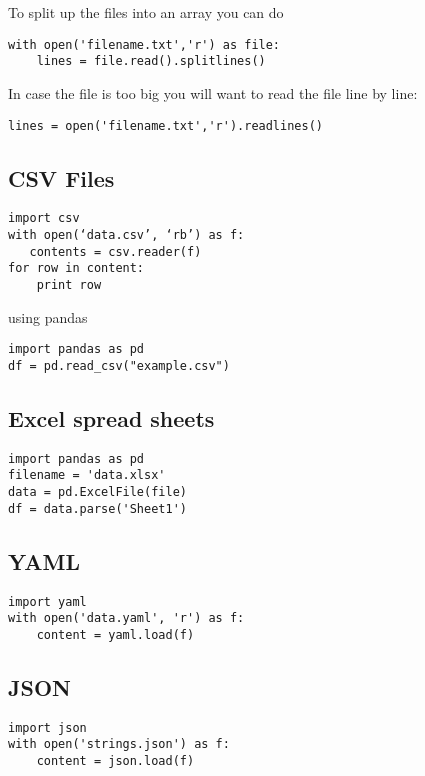 To split up the files into an array you can do

\begin{verbatim}
with open('filename.txt','r') as file:
    lines = file.read().splitlines()
\end{verbatim}


In case the file is too big you will want to read the file line by
line:

\begin{verbatim}
lines = open('filename.txt','r').readlines()
\end{verbatim}


\subsection{CSV Files}

\begin{verbatim}
import csv
with open(‘data.csv’, ‘rb’) as f:
   contents = csv.reader(f)
for row in content:
    print row
\end{verbatim}

using pandas

\begin{verbatim}
import pandas as pd
df = pd.read_csv("example.csv") 
\end{verbatim}

\subsection{Excel spread sheets}

\begin{verbatim}
import pandas as pd
filename = 'data.xlsx'
data = pd.ExcelFile(file)
df = data.parse('Sheet1')
\end{verbatim}

\subsection{YAML}

\begin{verbatim}
import yaml
with open('data.yaml', 'r') as f:
    content = yaml.load(f)
\end{verbatim}

\subsection{JSON}

\begin{verbatim}
import json
with open('strings.json') as f:
    content = json.load(f)
\end{verbatim}

